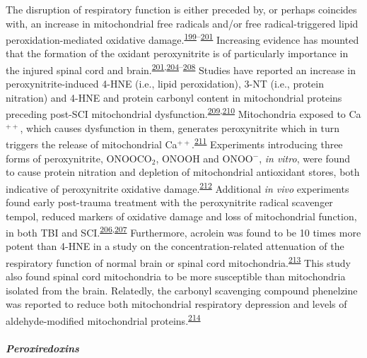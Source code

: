 \documentclass[
]{article}
\begin{document}
The disruption of respiratory function is either preceded by, or perhaps coincides with, an increase in mitochondrial free radicals and/or free radical-triggered lipid peroxidation-mediated oxidative damage.\textsuperscript{\protect\hyperlink{ref-singh_time_2006}{199}--\protect\hyperlink{ref-sullivan_temporal_2007}{201}}
Increasing evidence has mounted that the formation of the oxidant peroxynitrite is of particularly importance in the injured spinal cord and brain.\textsuperscript{\protect\hyperlink{ref-sullivan_temporal_2007}{201},\protect\hyperlink{ref-bao_peroxynitrite_2002}{204}--\protect\hyperlink{ref-xiong_role_2007}{208}}
Studies have reported an increase in peroxynitrite-induced 4-HNE (i.e., lipid peroxidation), 3-NT (i.e., protein nitration) and 4-HNE and protein carbonyl content in mitochondrial proteins preceding post-SCI mitochondrial dysfunction.\textsuperscript{\protect\hyperlink{ref-lopez-figueroa_direct_2000}{209},\protect\hyperlink{ref-zanella_mitochondrial_2002}{210}}
Mitochondria exposed to Ca\(^{++}\), which causes dysfunction in them, generates peroxynitrite which in turn triggers the release of mitochondrial Ca\(^{++}\).\textsuperscript{\protect\hyperlink{ref-bringold_peroxynitrite_2000}{211}}
Experiments introducing three forms of peroxynitrite, ONOOCO\(_2\), ONOOH and ONOO\(^-\), \emph{in vitro}, were found to cause protein nitration and depletion of mitochondrial antioxidant stores, both indicative of peroxynitrite oxidative damage.\textsuperscript{\protect\hyperlink{ref-valdez_reactions_2000}{212}}
Additional \emph{in vivo} experiments found early post-trauma treatment with the peroxynitrite radical scavenger tempol, reduced markers of oxidative damage and loss of mitochondrial function, in both TBI and SCI.\textsuperscript{\protect\hyperlink{ref-deng_temporal_2007}{206},\protect\hyperlink{ref-xiong_pharmacological_2009}{207}}
Furthermore, acrolein was found to be 10 times more potent than 4-HNE in a study on the concentration-related attenuation of the respiratory function of normal brain or spinal cord mitochondria.\textsuperscript{\protect\hyperlink{ref-vaishnav_lipid_2010}{213}}
This study also found spinal cord mitochondria to be more susceptible than mitochondria isolated from the brain.
Relatedly, the carbonyl scavenging compound phenelzine was reported to reduce both mitochondrial respiratory depression and levels of aldehyde-modified mitochondrial proteins.\textsuperscript{\protect\hyperlink{ref-singh_phenelzine_2013}{214}}

\hypertarget{peroxiredoxins}{%
\subparagraph{Peroxiredoxins}\label{peroxiredoxins}}
\end{document}
